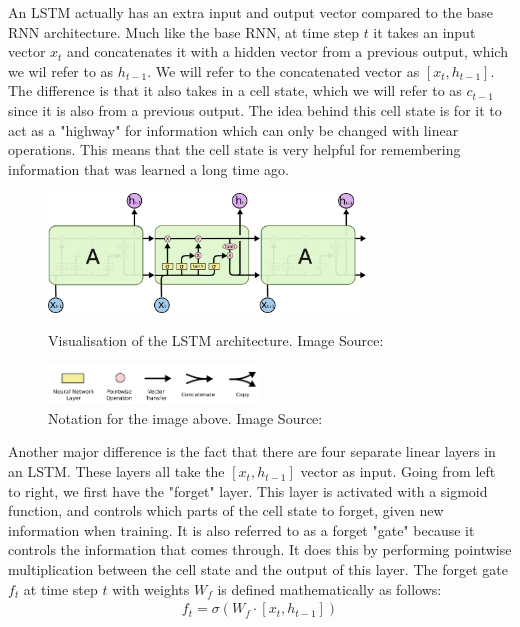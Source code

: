 \noindent
An LSTM actually has an extra input and output vector compared to the base RNN architecture. Much like the base RNN, at time step $t$ it takes an input vector $x_t$ and concatenates it with a hidden vector from a previous output, which we wil refer to as $h_{t-1}$. We will refer to the concatenated vector as $[x_t,h_{t-1}]$. The difference is that it also takes in a cell state, which we will refer to as $c_{t-1}$ since it is also from a previous output. The idea behind this cell state is for it to act as a "highway" for information which can only be changed with linear operations. This means that the cell state is very helpful for remembering information that was learned a long time ago.\\
\begin{figure}[h]
    \centering
        \includegraphics[width=0.75\textwidth]{latex/imgs/lstm.png}
    \caption{Visualisation of the LSTM architecture. Image Source:\cite{lstm}}
    \centering
        \includegraphics[width=0.5\textwidth]{latex/imgs/lstm_notation.png}
    \caption{Notation for the image above. Image Source:\cite{lstm}}
\end{figure}
Another major difference is the fact that there are four separate linear layers in an LSTM. These layers all take the $[x_t,h_{t-1}]$ vector as input. Going from left to right, we first have the "forget" layer. This layer is activated with a sigmoid function, and controls which parts of the cell state to forget, given new information when training. It is also referred to as a forget "gate" because it controls the information that comes through. It does this by performing pointwise multiplication between the cell state and the output of this layer. The forget gate $f_t$ at time step $t$ with weights $W_f$ is defined mathematically as follows:
\begin{align}
    f_t = \sigma (W_f \cdot [x_t,h_{t-1}])
\end{align}


